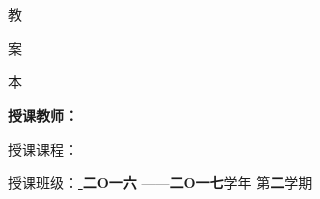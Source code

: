 \documentclass[a4paper,12pt]{article}
\begin{document}
\begin{titlepage}

\begin{center}
{ \yihao \bf
{}  \\
 \\ }
\vfill 
{ \yihao \fangsong  \fontsize{46pt}{80pt}\selectfont
   教
\par 案
\par 本
\par }
\par
\vfill \vfill \sihao \setlength{\baselineskip}{1cm}  \bf  
 授课教师：\underline{ \makebox[5cm]{ \jsxmNR}}\par
 授课课程：\underline{ }\par
授课班级：\underline{ \makebox[5cm]{ \skbcNR}} 
\vfill
{\bf 二O一六 }——{\bf 二O一七}学年\hspace{0.5cm} 第{\bf 二}学期
\end{center}
\vfill
\end{titlepage}


\tableofcontents
\setcounter{page}{-0}
\thispagestyle{empty}

\xiaosi

%
%
%
%
%
%
%
%
%
%
%
%


\setcounter{section}{0}%
%
%


%
%
%
%
%
%
%
\end{document}
